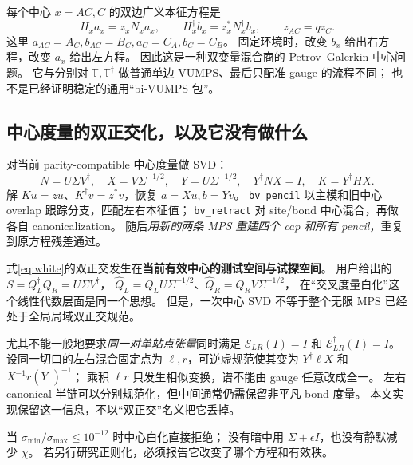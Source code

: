 \documentclass[11pt]{article}
\newcommand{\code}[1]{{\small\texttt{#1}}}
\begin{document}
每个中心 $x=AC,C$ 的双边广义本征方程是
\begin{equation}
 H_x a_x=z_x N_xa_x,\qquad
 H_x^\dagger b_x=z_x^*N_x^\dagger b_x,
 \qquad z_{AC}=qz_C.
 \label{eq:pencil}
\end{equation}
这里 $a_{AC}=A_C,b_{AC}=B_C,a_C=C_A,b_C=C_B$。
固定环境时，改变 $b_x$ 给出右方程，改变 $a_x$ 给出左方程。
因此这是一种双变量混合商的 Petrov--Galerkin 中心问题。
它与分别对 $\mathbb T,\mathbb T^\dagger$ 做普通单边 VUMPS、最后只配准 gauge 的流程不同；
也不是已经证明稳定的通用“bi-VUMPS 包”。

\subsection{中心度量的双正交化，以及它没有做什么}
对当前 parity-compatible 中心度量做 SVD：
\begin{equation}
 N=U\Sigma V^\dagger,\quad
 X=V\Sigma^{-1/2},\quad Y=U\Sigma^{-1/2},\quad
 Y^\dagger N X=I,\quad K=Y^\dagger H X.
 \label{eq:white}
\end{equation}
解 $Ku=z u$、$K^\dagger v=z^*v$，恢复 $a=Xu,b=Yv$。
\code{bv\_pencil} 以主模和旧中心 overlap 跟踪分支，匹配左右本征值；
\code{bv\_retract} 对 site/bond 中心混合，再做各自 canonicalization。
随后\emph{用新的两条 MPS 重建四个 cap 和所有 pencil}，重复到原方程残差通过。

式\eqref{eq:white}的双正交发生在\textbf{当前有效中心的测试空间与试探空间}。
用户给出的 $S=Q_L^\dagger Q_R=U\Sigma V^\dagger$，
$\widehat Q_L=Q_LU\Sigma^{-1/2}$、$\widehat Q_R=Q_RV\Sigma^{-1/2}$，
在“交叉度量白化”这个线性代数层面是同一个思想。
但是，一次中心 SVD 不等于整个无限 MPS 已经处于全局局域双正交规范。

尤其不能一般地要求\emph{同一对单站点张量}同时满足
$\mathcal E_{LR}(I)=I$ 和 $\mathcal E_{LR}^\dagger(I)=I$。
设同一切口的左右混合固定点为 $\ell,r$，可逆虚规范使其变为
$Y^\dagger\ell X$ 和 $X^{-1}r(Y^\dagger)^{-1}$；
乘积 $\ell r$ 只发生相似变换，谱不能由 gauge 任意改成全一。
左右 canonical 半链可以分别规范化，但中间通常仍需保留非平凡 bond 度量。
本文实现保留这一信息，不以“双正交”名义把它丢掉。

当 $\sigma_{\min}/\sigma_{\max}\le10^{-12}$ 时中心白化直接拒绝；
没有暗中用 $\Sigma+\epsilon I$，也没有静默减少 $\chi$。
若另行研究正则化，必须报告它改变了哪个方程和有效秩。
\end{document}
